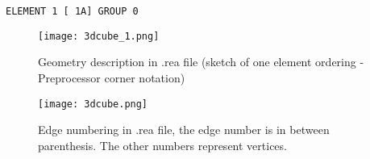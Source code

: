 \begin{description}
\begin{table}
\begin{center}
 \texttt{ELEMENT           1 [    1A]    GROUP    0}
\caption{Geometry description in .rea file}
\label{tab:element}
\end{center}
\end{table} 
\normalsize

\begin{figure}
\begin{center}
\texttt{[image: 3dcube\_1.png]}
\caption{Geometry description in .rea file (sketch of one element ordering - Preprocessor corner notation)}
\label{fig:elorder}
\end{center}
\end{figure}

\begin{figure}
\begin{center}
\texttt{[image: 3dcube.png]}
\caption{Edge numbering in .rea file, the edge number is in between parenthesis. The other numbers represent vertices.}
\label{fig:edges}
\end{center}
\end{figure}



\end{description}
